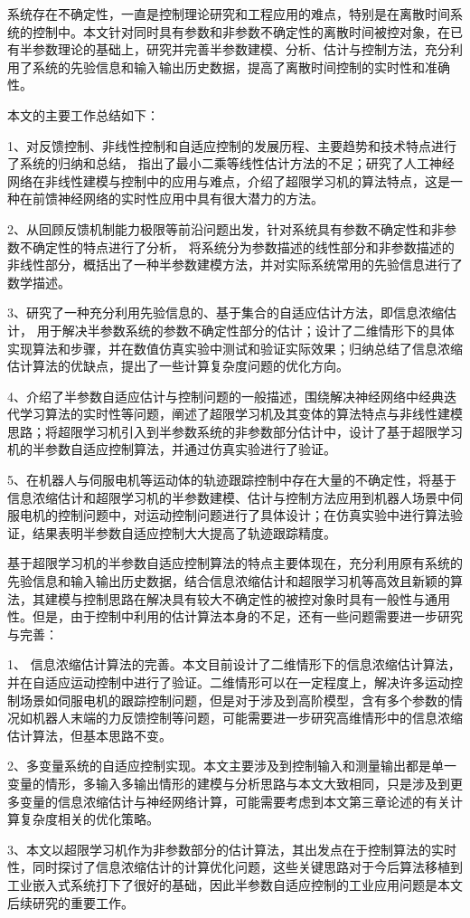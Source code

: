 
\begin{conclusion}
系统存在不确定性，一直是控制理论研究和工程应用的难点，特别是在离散时间系统的控制中。本文针对同时具有参数和非参数不确定性的离散时间被控对象，在已有半参数理论的基础上，研究并完善半参数建模、分析、估计与控制方法，充分利用了系统的先验信息和输入输出历史数据，提高了离散时间控制的实时性和准确性。

本文的主要工作总结如下：

1、对反馈控制、非线性控制和自适应控制的发展历程、主要趋势和技术特点进行了系统的归纳和总结，
指出了最小二乘等线性估计方法的不足；研究了人工神经网络在非线性建模与控制中的应用与难点，介绍了超限学习机的算法特点，这是一种在前馈神经网络的实时性应用中具有很大潜力的方法。

2、从回顾反馈机制能力极限等前沿问题出发，针对系统具有参数不确定性和非参数不确定性的特点进行了分析，
将系统分为参数描述的线性部分和非参数描述的非线性部分，概括出了一种半参数建模方法，并对实际系统常用的先验信息进行了数学描述。

3、研究了一种充分利用先验信息的、基于集合的自适应估计方法，即信息浓缩估计，
用于解决半参数系统的参数不确定性部分的估计；设计了二维情形下的具体实现算法和步骤，并在数值仿真实验中测试和验证实际效果；归纳总结了信息浓缩估计算法的优缺点，提出了一些计算复杂度问题的优化方向。

4、介绍了半参数自适应估计与控制问题的一般描述，围绕解决神经网络中经典迭代学习算法的实时性等问题，阐述了超限学习机及其变体的算法特点与非线性建模思路；将超限学习机引入到半参数系统的非参数部分估计中，设计了基于超限学习机的半参数自适应控制算法，并通过仿真实验进行了验证。

5、在机器人与伺服电机等运动体的轨迹跟踪控制中存在大量的不确定性，将基于信息浓缩估计和超限学习机的半参数建模、估计与控制方法应用到机器人场景中伺服电机的控制问题中，对运动控制问题进行了具体设计；在仿真实验中进行算法验证，结果表明半参数自适应控制大大提高了轨迹跟踪精度。

基于超限学习机的半参数自适应控制算法的特点主要体现在，充分利用原有系统的先验信息和输入输出历史数据，结合信息浓缩估计和超限学习机等高效且新颖的算法，其建模与控制思路在解决具有较大不确定性的被控对象时具有一般性与通用性。但是，由于控制中利用的估计算法本身的不足，还有一些问题需要进一步研究与完善：

1、 信息浓缩估计算法的完善。本文目前设计了二维情形下的信息浓缩估计算法，并在自适应运动控制中进行了验证。二维情形可以在一定程度上，解决许多运动控制场景如伺服电机的跟踪控制问题，但是对于涉及到高阶模型，含有多个参数的情况如机器人末端的力反馈控制等问题，可能需要进一步研究高维情形中的信息浓缩估计算法，但基本思路不变。

2、多变量系统的自适应控制实现。本文主要涉及到控制输入和测量输出都是单一变量的情形，多输入多输出情形的建模与分析思路与本文大致相同，只是涉及到更多变量的信息浓缩估计与神经网络计算，可能需要考虑到本文第三章论述的有关计算复杂度相关的优化策略。

3、本文以超限学习机作为非参数部分的估计算法，其出发点在于控制算法的实时性，同时探讨了信息浓缩估计的计算优化问题，这些关键思路对于今后算法移植到工业嵌入式系统打下了很好的基础，因此半参数自适应控制的工业应用问题是本文后续研究的重要工作。

\end{conclusion}